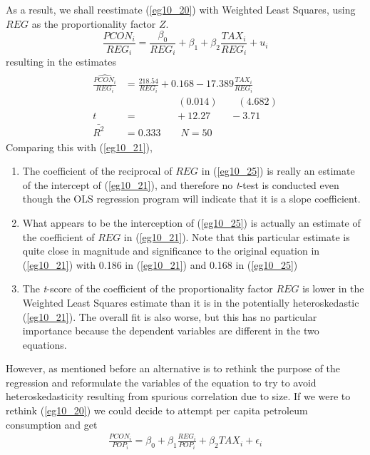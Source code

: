 \documentclass[11pt]{article}
\begin{document}
As a result, we shall reestimate (\ref{eg10_20}) with Weighted Least Squares, using $REG$ as the proportionality factor $Z$. 
\begin{equation}
\frac{PCON_i}{REG_i} = \frac{\beta_0}{REG_i} + \beta_1 + \beta_2\frac{TAX_i}{REG_i} + u_i \label{eg10_24}
\end{equation}
resulting in the estimates
\begin{align}
\label{eg10_25}
\begin{split}
\widehat{\frac{PCON_i}{REG_i}} &= \frac{218.54}{REG_i} + 0.168 - 17.389\frac{TAX_i}{REG_i}\\
&\>\>\>\>\>\>\>\>\>\>\>\>\>\>\>\>\>\>\>\>\>\>\>\> (0.014) 
\>\>\>\>\>\>\>\>\> (4.682)\\
t&=\>\>\>\>\>\>\>\>\>\>\>\>\>\>\>\>\> +12.27 
\>\>\>\>\>\>\>\>\> -3.71\\
\bar{R^2}&= 0.333 \quad\quad N=50
\end{split}
\end{align}
Comparing this with (\ref{eg10_21}), 
\begin{enumerate}
\item The coefficient of the reciprocal of $REG$ in (\ref{eg10_25}) is really an estimate of the intercept of (\ref{eg10_21}), and therefore no \textit{t}-test is conducted even though the OLS regression program will indicate that it is a slope coefficient.
\item What appears to be the interception of (\ref{eg10_25}) is actually an estimate of the coefficient of $REG$ in (\ref{eg10_21}). Note that this particular estimate is quite close in magnitude and significance to the original equation in (\ref{eg10_21}) with 0.186 in (\ref{eg10_21}) and 0.168 in (\ref{eg10_25})
\item The \textit{t}-score of the coefficient of the proportionality factor $REG$ is lower in the Weighted Least Squares estimate than it is in the potentially heteroskedastic (\ref{eg10_21}). The overall fit is also worse, but this has no particular importance because the dependent variables are different in the two equations. 
\end{enumerate}
However, as mentioned before an alternative is to rethink the purpose of the regression and reformulate the variables of the equation to try to avoid heteroskedasticity resulting from spurious correlation due to size. If we were to rethink (\ref{eg10_20}) we could decide to attempt per capita petroleum consumption and get
\begin{align}
\frac{PCON_i}{POP_i} = \beta_0 + \beta_1\frac{REG_i}{POP_i} + \beta_2TAX_i + \epsilon_i \label{eg10_26}
\end{align}
\end{document}
